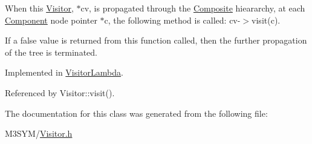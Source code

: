 When this \hyperlink{classVisitor}{Visitor}, $\ast$cv, is propagated through the \hyperlink{classComposite}{Composite} hieararchy, at each \hyperlink{classComponent}{Component} node pointer $\ast$c, the following method is called\+: cv-\/$>$visit(c). 

If a false value is returned from this function called, then the further propagation of the tree is terminated. 

Implemented in \hyperlink{classVisitorLambda_af934df1d8669dd315d824d9ee706f250}{Visitor\+Lambda}.



Referenced by Visitor\+::visit().



The documentation for this class was generated from the following file\+:\begin{DoxyCompactItemize}
\item 
M3\+S\+Y\+M/\hyperlink{Visitor_8h}{Visitor.\+h}\end{DoxyCompactItemize}
